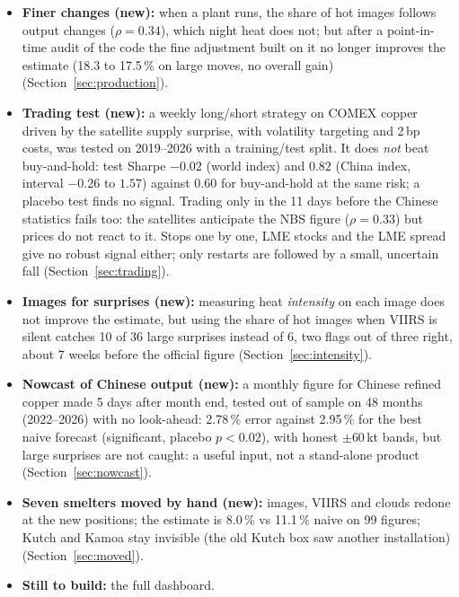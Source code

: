 \documentclass[10pt,a4paper]{article}
\begin{document}
\begin{keybox}
\begin{itemize}[leftmargin=1.2em]
  \item \textbf{Finer changes (new):} when a plant runs, the share of hot images follows output changes ($\rho=0.34$), which night heat does not; but after a point-in-time audit of the code the fine adjustment built on it no longer improves the estimate (18.3 to 17.5\,\% on large moves, no overall gain) (Section~\ref{sec:production}).
  \item \textbf{Trading test (new):} a weekly long/short strategy on COMEX copper driven by the satellite supply surprise, with volatility targeting and 2\,bp costs, was tested on 2019--2026 with a training/test split. It does \emph{not} beat buy-and-hold: test Sharpe $-0.02$ (world index) and $0.82$ (China index, interval $-0.26$ to $1.57$) against $0.60$ for buy-and-hold at the same risk; a placebo test finds no signal. Trading only in the 11 days before the Chinese statistics fails too: the satellites anticipate the NBS figure ($\rho=0.33$) but prices do not react to it. Stops one by one, LME stocks and the LME spread give no robust signal either; only restarts are followed by a small, uncertain fall (Section~\ref{sec:trading}).
  \item \textbf{Images for surprises (new):} measuring heat \emph{intensity} on each image does not improve the estimate, but using the share of hot images when VIIRS is silent catches 10 of 36 large surprises instead of 6, two flags out of three right, about 7 weeks before the official figure (Section~\ref{sec:intensity}).
  \item \textbf{Nowcast of Chinese output (new):} a monthly figure for Chinese refined copper made 5 days after month end, tested out of sample on 48 months (2022--2026) with no look-ahead: 2.78\,\% error against 2.95\,\% for the best naive forecast (significant, placebo $p<0.02$), with honest $\pm$60\,kt bands, but large surprises are not caught: a useful input, not a stand-alone product (Section~\ref{sec:nowcast}).
  \item \textbf{Seven smelters moved by hand (new):} images, VIIRS and clouds redone at the new positions; the estimate is 8.0\,\% vs 11.1\,\% naive on 99 figures; Kutch and Kamoa stay invisible (the old Kutch box saw another installation) (Section~\ref{sec:moved}).
  \item \textbf{Still to build:} the full dashboard.
\end{itemize}
\end{keybox}
\end{document}
